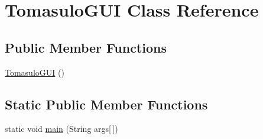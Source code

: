 \hypertarget{classTomasuloGUI}{\section{\-Tomasulo\-G\-U\-I \-Class \-Reference}
\label{classTomasuloGUI}
}
\subsection*{\-Public \-Member \-Functions}
\begin{DoxyCompactItemize}
\item 
\hyperlink{classTomasuloGUI_ae08510dffd34fb9fa786eff57481f1b9}{\-Tomasulo\-G\-U\-I} ()
\end{DoxyCompactItemize}
\subsection*{\-Static \-Public \-Member \-Functions}
\begin{DoxyCompactItemize}
\item 
static void \hyperlink{classTomasuloGUI_a28606c7d567bd1e006e010515cbbe873}{main} (\-String args\mbox{[}$\,$\mbox{]})
\end{DoxyCompactItemize}
